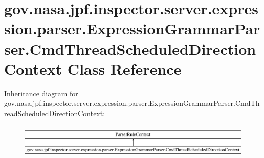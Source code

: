 \hypertarget{classgov_1_1nasa_1_1jpf_1_1inspector_1_1server_1_1expression_1_1parser_1_1_expression_grammar_pa3ae49d5d83c380526042a5aff91ee0a2}{}\section{gov.\+nasa.\+jpf.\+inspector.\+server.\+expression.\+parser.\+Expression\+Grammar\+Parser.\+Cmd\+Thread\+Scheduled\+Direction\+Context Class Reference}
\label{classgov_1_1nasa_1_1jpf_1_1inspector_1_1server_1_1expression_1_1parser_1_1_expression_grammar_pa3ae49d5d83c380526042a5aff91ee0a2}
Inheritance diagram for gov.\+nasa.\+jpf.\+inspector.\+server.\+expression.\+parser.\+Expression\+Grammar\+Parser.\+Cmd\+Thread\+Scheduled\+Direction\+Context\+:\begin{figure}[H]
\begin{center}
\leavevmode
\includegraphics[height=1.671642cm]{classgov_1_1nasa_1_1jpf_1_1inspector_1_1server_1_1expression_1_1parser_1_1_expression_grammar_pa3ae49d5d83c380526042a5aff91ee0a2}
\end{center}
\end{figure}
